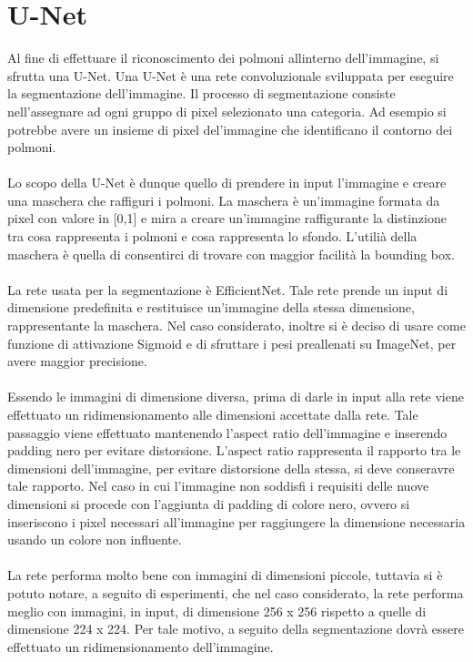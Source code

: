 \section{U-Net}
Al fine di effettuare il riconoscimento dei polmoni allinterno dell'immagine, si sfrutta una U-Net.
Una U-Net è una rete convoluzionale sviluppata per eseguire la segmentazione dell'immagine. Il processo di segmentazione consiste nell'assegnare ad 
ogni gruppo di pixel selezionato una categoria. Ad esempio si potrebbe avere un insieme di pixel del'immagine che identificano il contorno dei polmoni.
\\\\
Lo scopo della U-Net è dunque quello di prendere in input l'immagine e creare una maschera che raffiguri i polmoni.
La maschera è un'immagine formata da pixel con valore in [0,1] e mira a creare un'immagine raffigurante la distinzione tra cosa rappresenta 
i polmoni e cosa rappresenta lo sfondo.
L'utilià della maschera è quella di consentirci di trovare con maggior facilità la bounding box.
\\\\
La rete usata per la segmentazione è EfficientNet. Tale rete prende un input di dimensione predefinita e restituisce un'immagine della stessa
dimensione, rappresentante la maschera. Nel caso considerato, inoltre si è deciso di usare come funzione di attivazione Sigmoid e di sfruttare 
i pesi preallenati su ImageNet, per avere maggior precisione.
\\\\
Essendo le immagini di dimensione diversa, prima di darle in input alla rete viene effettuato un ridimensionamento alle dimensioni accettate dalla rete. 
Tale passaggio viene effettuato mantenendo l'aspect ratio dell'immagine e inserendo padding nero per evitare distorsione.
L'aspect ratio rappresenta il rapporto tra le dimensioni dell'immagine, per evitare distorsione della stessa, si deve conseravre tale rapporto.
Nel caso in cui l'immagine non soddisfi i requisiti delle nuove dimensioni si procede con l'aggiunta di padding di colore nero, ovvero si inseriscono i pixel necessari 
all'immagine per raggiungere la dimensione necessaria usando un colore non influente. 
\\\\
La rete performa molto bene con immagini di dimensioni piccole, tuttavia si è potuto notare, a seguito di esperimenti, che nel caso considerato, la rete 
performa meglio con immagini, in input, di dimensione 256 x 256 rispetto a quelle di dimensione 224 x 224.
Per tale motivo, a seguito della segmentazione dovrà essere effettuato un ridimensionamento dell'immagine.

